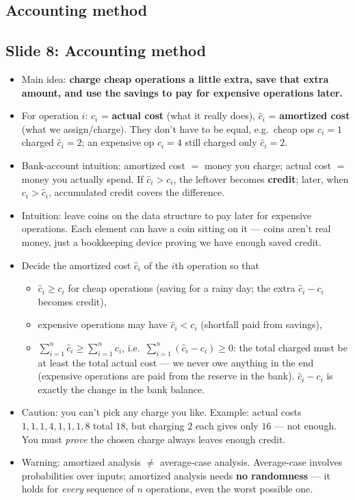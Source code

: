\documentclass[11pt]{article}
\newcommand{\slide}[2]{\subsection*{Slide #1: #2}}
\begin{document}
\subsection*{Accounting method}

\slide{8}{Accounting method}
\begin{itemize}
  \item Main idea: \textbf{charge cheap operations a little extra, save that extra amount, and use the savings to pay for expensive operations later.}
  \item For operation $i$: $c_i$ = \textbf{actual cost} (what it really does), $\hat{c}_i$ = \textbf{amortized cost} (what we assign/charge). They don't have to be equal, e.g.\ cheap ops $c_i = 1$ charged $\hat{c}_i = 2$; an expensive op $c_i = 4$ still charged only $\hat{c}_i = 2$.
  \item Bank-account intuition: amortized cost $=$ money you charge; actual cost $=$ money you actually spend. If $\hat{c}_i > c_i$, the leftover becomes \textbf{credit}; later, when $c_i > \hat{c}_i$, accumulated credit covers the difference.
  \item Intuition: leave coins on the data structure to pay later for expensive operations. Each element can have a coin sitting on it --- coins aren't real money, just a bookkeeping device proving we have enough saved credit.
  \item Decide the amortized cost $\hat{c}_i$ of the $i$th operation so that
  \begin{itemize}
    \item $\hat{c}_i \ge c_i$ for cheap operations (saving for a rainy day; the extra $\hat{c}_i - c_i$ becomes credit),
    \item expensive operations may have $\hat{c}_i < c_i$ (shortfall paid from savings),
    \item $\sum_{i=1}^{n} \hat{c}_i \ge \sum_{i=1}^{n} c_i$, i.e.\ $\sum_{i=1}^{n} (\hat{c}_i - c_i) \ge 0$: the total charged must be at least the total actual cost --- we never owe anything in the end (expensive operations are paid from the reserve in the bank). $\hat{c}_i - c_i$ is exactly the change in the bank balance.
  \end{itemize}
  \item Caution: you can't pick any charge you like. Example: actual costs $1, 1, 1, 4, 1, 1, 1, 8$ total $18$, but charging $2$ each gives only $16$ --- not enough. You must \emph{prove} the chosen charge always leaves enough credit.
  \item Warning: amortized analysis $\ne$ average-case analysis. Average-case involves probabilities over inputs; amortized analysis needs \textbf{no randomness} --- it holds for \emph{every} sequence of $n$ operations, even the worst possible one.
\end{itemize}
\end{document}
